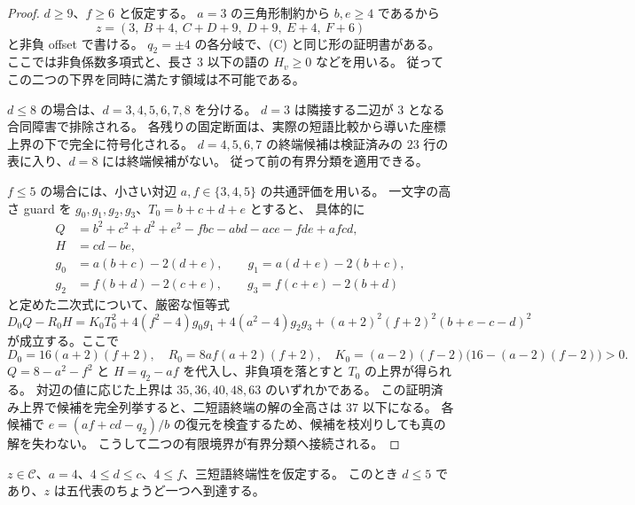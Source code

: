 \begin{proof}
\leanok
$d\geq9$、$f\geq6$ と仮定する。
$a=3$ の三角形制約から $b,e\geq4$ であるから
\[
 z=(3,\ B+4,\ C+D+9,\ D+9,\ E+4,\ F+6)
\]
と非負 offset で書ける。
$q_2=\pm4$ の各分岐で、(C) と同じ形の証明書がある。
ここでは非負係数多項式と、長さ $3$ 以下の語の $H_v\geq0$ などを用いる。
従ってこの二つの下界を同時に満たす領域は不可能である。

$d\leq8$ の場合は、$d=3,4,5,6,7,8$ を分ける。
$d=3$ は隣接する二辺が $3$ となる合同障害で排除される。
各残りの固定断面は、実際の短語比較から導いた座標上界の下で完全に符号化される。
$d=4,5,6,7$ の終端候補は検証済みの $23$ 行の表に入り、$d=8$ には終端候補がない。
従って前の有界分類を適用できる。

$f\leq5$ の場合には、小さい対辺 $a,f\in\{3,4,5\}$ の共通評価を用いる。
一文字の高さ guard を $g_0,g_1,g_2,g_3$、$T_0=b+c+d+e$ とすると、
具体的に
\[
\begin{split}
 Q&=b^2+c^2+d^2+e^2-fbc-abd-ace-fde+afcd,\\
 H&=cd-be,\\
 g_0&=a(b+c)-2(d+e),\qquad g_1=a(d+e)-2(b+c),\\
 g_2&=f(b+d)-2(c+e),\qquad g_3=f(c+e)-2(b+d)
\end{split}
\]
と定めた二次式について、厳密な恒等式
\[
 D_0 Q-R_0 H
 =K_0T_0^2+4(f^2-4)g_0g_1+4(a^2-4)g_2g_3
 +(a+2)^2(f+2)^2(b+e-c-d)^2
\]
が成立する。ここで
\[
 D_0=16(a+2)(f+2),\quad R_0=8af(a+2)(f+2),\quad
 K_0=(a-2)(f-2)\bigl(16-(a-2)(f-2)\bigr)>0.
\]
$Q=8-a^2-f^2$ と $H=q_2-af$ を代入し、非負項を落とすと $T_0$ の上界が得られる。
対辺の値に応じた上界は $35,36,40,48,63$ のいずれかである。
この証明済み上界で候補を完全列挙すると、二短語終端の解の全高さは $37$ 以下になる。
各候補で $e=(af+cd-q_2)/b$ の復元を検査するため、候補を枝刈りしても真の解を失わない。
こうして二つの有限境界が有界分類へ接続される。
\end{proof}

\begin{proposition}
\label{bp:pos-four}
\leanok
$z\in\mathcal C$、$a=4$、$4\leq d\leq c$、$4\leq f$、三短語終端性を仮定する。
このとき $d\leq5$ であり、$z$ は五代表のちょうど一つへ到達する。
\end{proposition}

